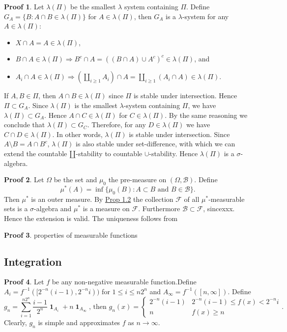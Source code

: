 \documentclass[hidelinks,11pt]{article}
\theoremstyle{definition}
\theoremstyle{dotless}
\newtheorem{prop}{Proof}[section]
\theoremstyle{remark}
\DeclareMathOperator{\1}{\mathbf{1}}
\begin{document}
\begin{prop}
Let $\lambda(\Pi)$ be the smallest $\lambda$ system containing $\Pi$. Define $G_A=\{B:A\cap B\in\lambda(\Pi)\}$ for $A\in\lambda(\Pi)$, then $G_A$ is a $\lambda$-system for any $A\in\lambda(\Pi)$:\begin{itemize}
    \item $X\cap A=A\in\lambda(\Pi)$,
    \item $B\cap A\in\lambda(\Pi)\Rightarrow B^c\cap A=((B\cap A)\cup A^c)^c\in\lambda(\Pi)$, and
    \item $A_i\cap A\in\lambda(\Pi)\Rightarrow(\amalg_{i\geq1}A_i)\cap A=\amalg_{i\geq1}(A_i\cap A)\in\lambda(\Pi)$.
\end{itemize}
If $A,B\in\Pi$, then $A\cap B\in\lambda(\Pi)$ since $\Pi$ is stable under intersection. Hence $\Pi\subset G_A$. Since $\lambda(\Pi)$ is the smallest $\lambda$-system containing $\Pi$, we have $\lambda(\Pi)\subset G_A$. Hence $A\cap C\in\lambda(\Pi)$ for $C\in\lambda(\Pi)$. By the same reasoning we conclude that $\lambda(\Pi)\subset G_C$. Therefore, for any $D\in\lambda(\Pi)$ we have $C\cap D\in\lambda(\Pi)$. In other words, $\lambda(\Pi)$ is stable under intersection.\medbreak
Since $A\setminus B=A\cap B^c$, $\lambda(\Pi)$ is also stable under set-difference, with which we can extend the countable $\amalg$-stability to countable $\cup$-stability. Hence $\lambda(\Pi)$ is a $\sigma$-algebra.
\end{prop}

\begin{prop}
Let $\Omega$ be the set and $\mu_0$ the pre-measure on $(\Omega,\mathcal{B})$. Define
\[\mu^\ast(A)=\inf\{\mu_0(B):A\subset B\textrm{ and }B\in\mathcal{B}\}.\]
Then $\mu^\ast$ is an outer measure. By \hyperref[Prop 1.2]{Prop 1.2} the collection $\mathcal{F}$ of all $\mu^\ast$-measurable sets is a $\sigma$-algebra and $\mu^\ast$ is a measure on $\mathcal{F}$. Furthermore $\mathcal{B}\subset\mathcal{F}$, sincexxx. Hence the extension is valid.\medbreak
The uniqueness follows from 
\end{prop}

\begin{prop}
properties of measurable functions
\end{prop}

\subsection{Integration}

\begin{prop}
Let $f$ be any non-negative measurable function.Define $A_i=f^{-1}([2^{-n}(i-1),2^{-n}i))$
for $1\leq i\leq n2^n$ and $A_\infty=f^{-1}([n,\infty])$. Define
\[g_n=\sum_{i=1}^{n2^n}\frac{i-1}{2^n}\1_{A_i}+n\1_{A_\infty}\textrm{, then }g_n(x)=\begin{cases}
2^{-n}(i-1)&2^{-n}(i-1)\leq f(x)<2^{-n}i\\
n&f(x)\geq n
\end{cases}.\]
Clearly, $g_n$ is simple and approximates $f$ as $n\to\infty$.
\end{prop}
\end{document}
